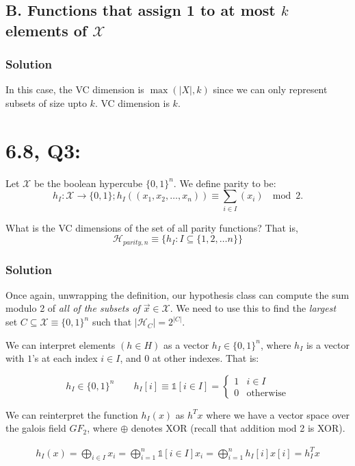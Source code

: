 \documentclass[11pt]{article}
\renewcommand{\H}{\ensuremath{\mathcal{H}}}
\newcommand{\X}{\ensuremath{\mathcal{X}}}
\begin{document}
\subsection*{B. Functions that assign 1 to at most $k$ elements of \X}
\subsubsection*{Solution}
In this case, the VC dimension is $\max(|X|, k)$ since we can 
only represent subsets of size upto $k$.
VC dimension is $k$.


\section*{6.8, Q3:}
Let $\X$ be the boolean hypercube $\{0, 1\}^n$. We define parity to be:
$$h_I: \X \rightarrow \{0, 1\}; h_I((x_1, x_2, \dots, x_n)) \equiv \sum_{i \in I} (x_i) ~ \mod 2.$$

What is the VC dimensions of the set of all parity functions? That is,
$$\H_{parity, n} \equiv \{ h_I : I \subseteq \{1, 2, \dots n\} \}$$

\subsubsection*{Solution}

Once again, unwrapping the definition, our hypothesis class can compute the
sum modulo 2 of \emph{all of the subsets of $\vec x \in \X$}. We need to
use this to find the \emph{largest} set $C \subseteq \X \equiv \{0, 1\}^n$ such
that $|\H_C| = 2^{|C|}$. 

We can interpret elements $(h \in H)$ as a vector 
$h_I \in \{0, 1\}^n$, where $h_I$ is a vector with $1$'s at each index $i \in I$,
and $0$ at other indexes. That is:

$$
h_I \in \{0, 1\}^n \qquad
h_I[i] \equiv \mathbb{1}[i \in I] = 
\begin{cases} 1 & i \in I \\ 0 & \text{otherwise} \end{cases}
$$


We can reinterpret the function $h_I(x)$ as $h^T x$ where we have
a vector space over the galois field $GF_2$, where $\oplus$ denotes XOR (recall
that addition mod 2 is XOR).

\begin{align*}
h_I(x) = \bigoplus_{i \in I} x_i = \bigoplus_{i=1}^n \mathbb{1}[i \in I] x_i = \bigoplus_{i=1}^n h_I[i] x[i] =  h_I^T x
\end{align*}
\end{document}
